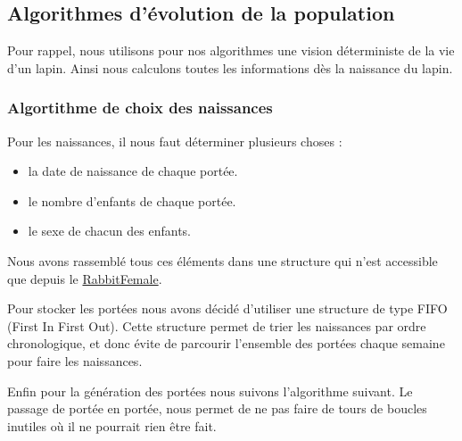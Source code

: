 \documentclass[11)pt,a4paper]{article}
\begin{document}
    \subsection{Algorithmes d'évolution de la population}
        Pour rappel, nous utilisons pour nos algorithmes une vision déterministe de la vie d'un lapin. 
        Ainsi nous calculons toutes les informations dès la naissance du lapin.
        \subsubsection{Algortithme de choix des naissances}
            Pour les naissances, il nous faut déterminer plusieurs choses :
            \begin{itemize}
                \item la date de naissance de chaque portée.
                \item le nombre d'enfants de chaque portée.
                \item le sexe de chacun des enfants.
            \end{itemize}
            Nous avons rassemblé tous ces éléments dans une structure qui n'est accessible que depuis le \underline{RabbitFemale}.
            \par
            \begin{mdframed}[backgroundcolor=light-gray, roundcorner=20pt, innerleftmargin=20, innertopmargin=1, innerbottommargin=1, outerlinewidth=1, linecolor=darkgray]
                
            \end{mdframed}
            Pour stocker les portées nous avons décidé d'utiliser une structure de type FIFO (First In First Out).
            Cette structure permet de trier les naissances par ordre chronologique, et donc évite de parcourir l'ensemble des portées chaque semaine pour faire les naissances.
            \begin{mdframed}[backgroundcolor=light-gray, roundcorner=20pt, innerleftmargin=20, innertopmargin=1, innerbottommargin=1, outerlinewidth=1, linecolor=darkgray]
                
            \end{mdframed}
            Enfin pour la génération des portées nous suivons l'algorithme suivant. 
            Le passage de portée en portée, nous permet de ne pas faire de tours de boucles inutiles où il ne pourrait rien être fait. 
\end{document}
